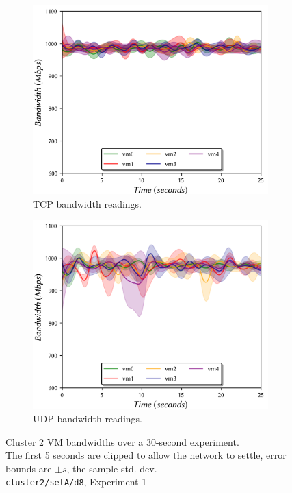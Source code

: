 \documentclass[a4paper,10pt]{article}
\begin{document}
\begin{figure}
\centering
\begin{subfigure}{.49\textwidth}
  \centering
  \includegraphics[width=\hsize]{figs/cluster2/setA/vis-3-1.png}
  \caption{TCP bandwidth readings.}
  \label{fig:bw-2:a}
\end{subfigure}%
\hfill%
\begin{subfigure}{.49\textwidth}
  \centering
  \includegraphics[width=\hsize]{figs/cluster2/setA/vis-3-2.png}
  \caption{UDP bandwidth readings.}
  \label{fig:bw-2:b}
\end{subfigure}%
\caption{\centering{} Cluster 2 VM bandwidths over a 30-second experiment. \\ The first 5 seconds are clipped to allow the network to settle, error bounds are $\pm s$, the sample std. dev. \\ \texttt{cluster2/setA/d8}, Experiment 1 }
\label{fig:bw-2}
\end{figure}
\end{document}
